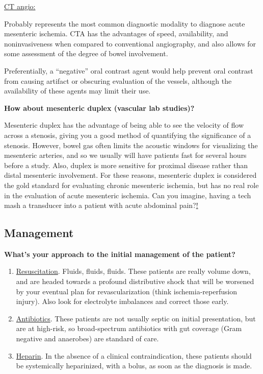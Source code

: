 \documentclass[
]{book}
\begin{document}
\uline{CT angio:}

Probably represents the most common diagnostic modality to diagnose
acute mesenteric ischemia. CTA has the advantages of speed,
availability, and noninvasiveness when compared to conventional
angiography, and also allows for some assessment of the degree of bowel
involvement.~

Preferentially, a ``negative'' oral contrast agent would help prevent oral
contrast from causing artifact or obscuring evaluation of the vessels,
although the availability of these agents may limit their use.

\textbf{How about mesenteric duplex (vascular lab studies)?}

Mesenteric duplex has the advantage of being able to see the velocity of
flow across a stenosis, giving you a good method of quantifying the
significance of a stenosis. However, bowel gas often limits the acoustic
windows for visualizing the mesenteric arteries, and so we usually will
have patients fast for several hours before a study. Also, duplex is
more sensitive for proximal disease rather than distal mesenteric
involvement. For these reasons, mesenteric duplex is considered the gold
standard for evaluating chronic mesenteric ischemia, but has no real
role in the evaluation of acute mesenteric ischemia. Can you imagine,
having a tech mash a transducer into a patient with acute abdominal
pain?\uline{!}~

\hypertarget{management-23}{%
\subsection{Management}\label{management-23}}

\textbf{What's your approach to the initial management of the patient?}

\begin{enumerate}
\def\labelenumi{\arabic{enumi}.}
\item
  \uline{Resuscitation}. Fluids, fluids, fluids. These patients
  are really volume down, and are headed towards a profound
  distributive shock that will be worsened by your eventual plan for
  revascularization (think ischemia-reperfusion injury). Also look for
  electrolyte imbalances and correct those early.
\item
  \uline{Antibiotics}. These patients are not usually septic on
  initial presentation, but are at high-risk, so broad-spectrum
  antibiotics with gut coverage (Gram negative and anaerobes) are
  standard of care.
\item
  \uline{Heparin}. In the absence of a clinical
  contraindication, these patients should be systemically heparinized,
  with a bolus, as soon as the diagnosis is made.~
\end{enumerate}
\end{document}
